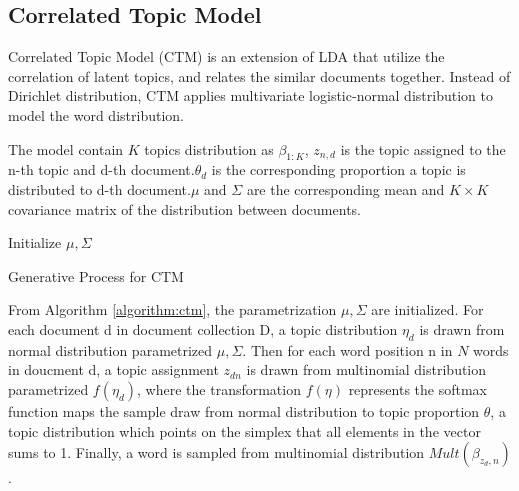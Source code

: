 \subsection{Correlated Topic Model} \label{ch2:ctm}
Correlated Topic Model (CTM)\cite{blei_correlated_2007} is an extension of LDA\cite{blei_latent_2003} that utilize the correlation of latent topics, and relates the similar documents together. Instead of Dirichlet distribution, CTM applies multivariate logistic-normal distribution to model the word distribution.

The model contain $ K $ topics distribution as $ \beta_{1:K} $, $ z_{n,d} $ is the topic assigned to the n-th topic and d-th document.$ \theta_d $ is the corresponding proportion a topic is distributed to d-th document.$ \mu $ and $ \Sigma $ are the corresponding mean and $ K \times K $ covariance matrix of the distribution between documents.\\
\begin{algorithm}[H]
Initialize $ \mu, \Sigma $\\
\label{algorithm:ctm}
\caption{Generative Process for CTM}
\end{algorithm}
From Algorithm \ref{algorithm:ctm}, the parametrization $ \mu, \Sigma $ are initialized. For each document d in document collection D, a topic distribution $ \eta_d $ is drawn from normal distribution parametrized $ \mu,\Sigma $. Then for each word position n in $ N $ words in doucment d, a topic assignment $ z_{dn} $ is drawn from multinomial distribution parametrized $ f(\eta_d) $, where the transformation $ f(\eta) $ represents the softmax function maps the sample draw from normal distribution to topic proportion $ \theta $, a topic distribution which points on the simplex that all elements in the vector sums to 1. Finally, a word is sampled from multinomial distribution $ Mult(\beta_{z_d,n}) $.
